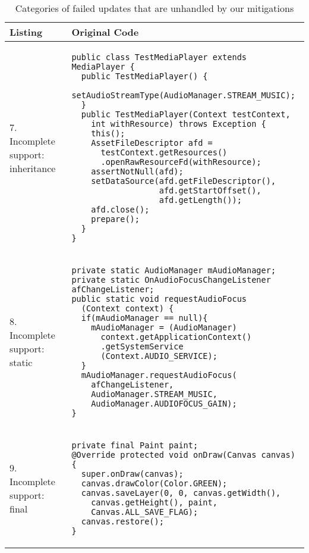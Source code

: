 \begin{table}
	\caption{Categories of failed updates that are unhandled by our mitigations}\label{tab:mitigatefail}
\centering
\begin{tabular}{|p{}|p{}|}
\hline
\textbf{Listing}
  &
  \textbf{Original Code}
 \\ \hline
7. Incomplete support: inheritance
&
\begin{lstlisting}
public class TestMediaPlayer extends MediaPlayer {
  public TestMediaPlayer() {
    setAudioStreamType(AudioManager.STREAM_MUSIC);
  }
  public TestMediaPlayer(Context testContext,
    int withResource) throws Exception {
    this();
    AssetFileDescriptor afd =
      testContext.getResources()
      .openRawResourceFd(withResource);
    assertNotNull(afd);
    setDataSource(afd.getFileDescriptor(),
                  afd.getStartOffset(),
                  afd.getLength());
    afd.close();
    prepare();
  }
}
\end{lstlisting}
\\ \hline
8. Incomplete support: static
&
\begin{lstlisting}
private static AudioManager mAudioManager;
private static OnAudioFocusChangeListener afChangeListener;
public static void requestAudioFocus
  (Context context) {
  if(mAudioManager == null){
    mAudioManager = (AudioManager)
      context.getApplicationContext()
      .getSystemService
      (Context.AUDIO_SERVICE);
  }
  mAudioManager.requestAudioFocus(
    afChangeListener,
    AudioManager.STREAM_MUSIC,
    AudioManager.AUDIOFOCUS_GAIN);
}
\end{lstlisting}
\\ \hline
9. Incomplete support: final
&
\begin{lstlisting}
private final Paint paint;
@Override protected void onDraw(Canvas canvas) {
  super.onDraw(canvas);
  canvas.drawColor(Color.GREEN);
  canvas.saveLayer(0, 0, canvas.getWidth(),
    canvas.getHeight(), paint,
    Canvas.ALL_SAVE_FLAG);
  canvas.restore();
}
\end{lstlisting}
\\ \hline
 \end{tabular}
 \end{table}


